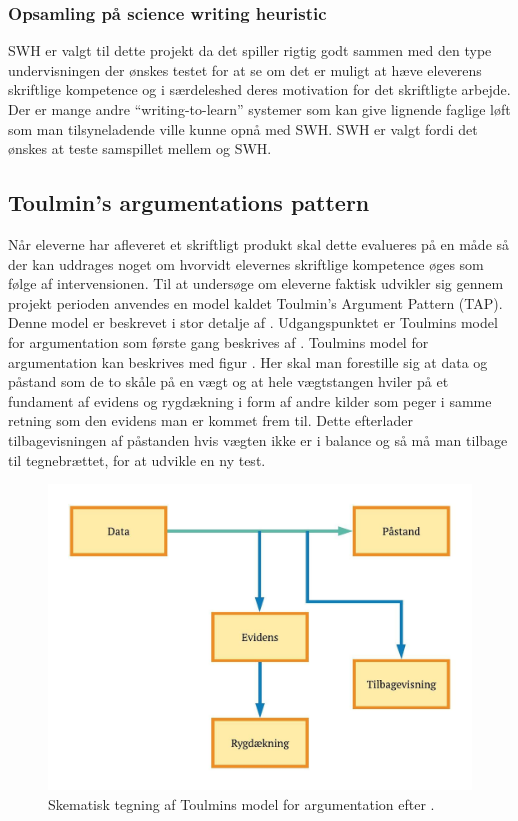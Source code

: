\subsubsection*{Opsamling på science writing heuristic}
SWH er valgt til dette projekt da det spiller rigtig godt sammen med den type undervisningen der ønskes testet for at se om det er muligt at hæve eleverens skriftlige kompetence og i særdeleshed deres motivation for det skriftligte arbejde. Der er mange andre ``writing-to-learn'' systemer som kan give lignende faglige løft som man tilsyneladende ville kunne opnå med SWH. SWH er valgt fordi det ønskes at teste samspillet mellem \ib{} og SWH.

\subsection*{Toulmin's argumentations pattern}
Når eleverne har afleveret et skriftligt produkt skal dette evalueres på en måde så der kan uddrages noget om hvorvidt elevernes skriftlige kompetence øges som følge af intervensionen. Til at undersøge om eleverne faktisk udvikler sig gennem projekt perioden anvendes en model kaldet Toulmin's Argument Pattern (TAP). Denne model er beskrevet i stor detalje af \citep{Erduran2004}. Udgangspunktet er Toulmins model for argumentation som første gang beskrives af \citep{Toulmin1958}. Toulmins model for argumentation kan beskrives med figur . Her skal man forestille sig at data og påstand som de to skåle på en vægt og at hele vægtstangen hviler på et fundament af evidens og rygdækning i form af andre kilder som peger i samme retning som den evidens man er kommet frem til. Dette efterlader tilbagevisningen af påstanden hvis vægten ikke er i balance og så må man tilbage til tegnebrættet, for at udvikle en ny test.
\begin{figure}
	\centering
	\includegraphics[width=.75\textwidth]{Figs/Toulmin}
	\caption[Toulmin's Argumentations Princip]{Skematisk tegning af Toulmins model for argumentation efter \citet{Toulmin1958}.}
	\label{fig:tou}
\end{figure}

